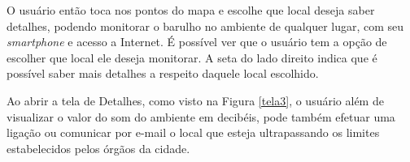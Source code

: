 \documentclass[
    12pt,               %
    openright,          %
    oneside,
    a4paper,            
    english,            %
    brazil              %
    ]{abntex2}
\begin{document}

O usuário então toca nos pontos do mapa e escolhe que local deseja saber detalhes, podendo monitorar o barulho no ambiente de qualquer lugar, com seu \textit{smartphone} e acesso a Internet. É possível ver que o usuário tem a opção de escolher que local ele deseja monitorar. A seta do lado direito indica que é possível saber mais detalhes a respeito daquele local escolhido.

Ao abrir a tela de Detalhes, como visto na Figura \ref{tela3}, o usuário além de visualizar o valor do som do ambiente em decibéis, pode também efetuar uma ligação ou comunicar por e-mail o local que esteja ultrapassando os limites estabelecidos pelos órgãos da cidade. 
\end{document}
